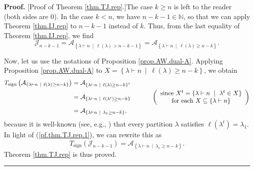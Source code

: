 \documentclass[numbers=enddot,12pt,final,onecolumn,notitlepage]{scrartcl}%
\numberwithin{exer}{subsection}
\theoremstyle{definition}
\newenvironment{proof}[1][Proof]{\noindent\textbf{#1.} }{\ \rule{0.5em}{0.5em}}
\begin{document}
\begin{proof}
[Proof of Theorem \ref{thm.TJ.rep}.]The case $k\geq n$ is left to the reader
(both sides are $0$). In the case $k<n$, we have $n-k-1\in\mathbb{N}$, so that
we can apply Theorem \ref{thm.IJ.rep} to $n-k-1$ instead of $k$. Thus, from
the last equality of Theorem \ref{thm.IJ.rep}, we find%
\begin{equation}
\mathcal{J}_{n-k-1}=\mathcal{A}_{\left\{  \lambda\vdash n\ \mid\ \ell\left(
\lambda\right)  >n-k-1\right\}  }=\mathcal{A}_{\left\{  \lambda\vdash
n\ \mid\ \ell\left(  \lambda\right)  \geq n-k\right\}  }.
\label{pf.thm.TJ.rep.1}%
\end{equation}


Now, let us use the notations of Proposition \ref{prop.AW.dual-A}. Applying
Proposition \ref{prop.AW.dual-A} to $X=\left\{  \lambda\vdash n\ \mid
\ \ell\left(  \lambda\right)  \geq n-k\right\}  $, we obtain%
\begin{align*}
T_{\operatorname*{sign}}\left(  \mathcal{A}_{\left\{  \lambda\vdash
n\ \mid\ \ell\left(  \lambda\right)  \geq n-k\right\}  }\right)   &
=\mathcal{A}_{\left\{  \lambda\vdash n\ \mid\ \ell\left(  \lambda\right)  \geq
n-k\right\}  ^{t}}\\
&  =\mathcal{A}_{\left\{  \lambda\vdash n\ \mid\ \ell\left(  \lambda
^{t}\right)  \geq n-k\right\}  }\ \ \ \ \ \ \ \ \ \ \left(
\begin{array}
[c]{c}%
\text{since }X^{t}=\left\{  \lambda\vdash n\ \mid\ \lambda^{t}\in X\right\} \\
\text{for each }X\subseteq\left\{  \lambda\vdash n\right\}
\end{array}
\right) \\
&  =\mathcal{A}_{\left\{  \lambda\vdash n\ \mid\ \lambda_{1}\geq n-k\right\}
},
\end{align*}
because it is well-known (see, e.g., \cite[Theorem 5.1.10 \textbf{(c)}]{sga})
that every partition $\lambda$ satisfies $\ell\left(  \lambda^{t}\right)
=\lambda_{1}$. In light of (\ref{pf.thm.TJ.rep.1}), we can rewrite this as%
\[
T_{\operatorname*{sign}}\left(  \mathcal{J}_{n-k-1}\right)  =\mathcal{A}%
_{\left\{  \lambda\vdash n\ \mid\ \lambda_{1}\geq n-k\right\}  }.
\]
Theorem \ref{thm.TJ.rep} is thus proved.
\end{proof}
\end{document}
